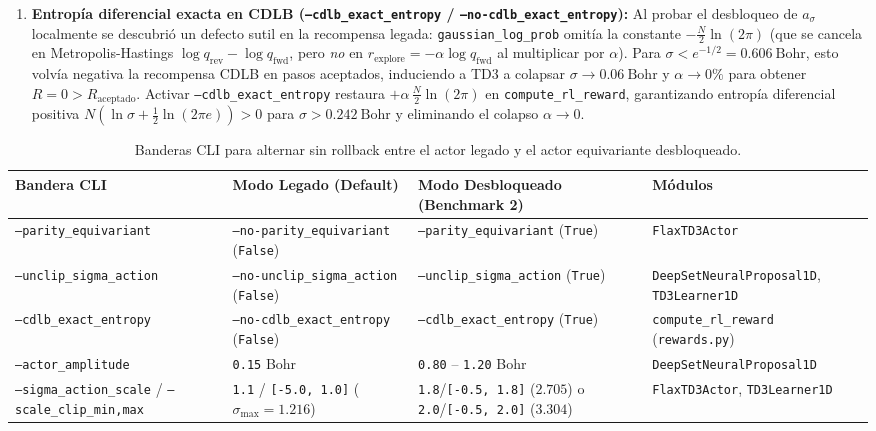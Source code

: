 \documentclass[10pt,a4paper]{article}
\begin{document}
\begin{enumerate}
\item \textbf{Entropía diferencial exacta en CDLB (\texttt{--cdlb\_exact\_entropy} / \texttt{--no-cdlb\_exact\_entropy}):} Al probar el desbloqueo de $a_\sigma$ localmente se descubrió un defecto sutil en la recompensa legada: \texttt{gaussian\_log\_prob} omitía la constante $-\frac{N}{2}\ln(2\pi)$ (que se cancela en Metropolis-Hastings $\log q_{\mathrm{rev}}-\log q_{\mathrm{fwd}}$, pero \emph{no} en $r_{\mathrm{explore}} = -\alpha \log q_{\mathrm{fwd}}$ al multiplicar por $\alpha$). Para $\sigma < e^{-1/2} = 0.606\ \mathrm{Bohr}$, esto volvía negativa la recompensa CDLB en pasos aceptados, induciendo a TD3 a colapsar $\sigma \to 0.06\ \mathrm{Bohr}$ y $\alpha \to 0\%$ para obtener $R = 0 > R_{\mathrm{aceptado}}$. Activar \texttt{--cdlb\_exact\_entropy} restaura $+\alpha\,\frac{N}{2}\ln(2\pi)$ en \texttt{compute\_rl\_reward}, garantizando entropía diferencial positiva $N(\ln\sigma + \frac{1}{2}\ln(2\pi e)) > 0$ para $\sigma > 0.242\ \mathrm{Bohr}$ y eliminando el colapso $\alpha \to 0$.
\end{enumerate}

\begin{table}[H]
\centering
\caption{Banderas CLI para alternar sin rollback entre el actor legado y el actor equivariante desbloqueado.}
\label{tab:actor_flags}
\begin{adjustbox}{max width=\textwidth}
\begin{tabular}{llll}
\toprule
\textbf{Bandera CLI} & \textbf{Modo Legado (Default)} & \textbf{Modo Desbloqueado (Benchmark 2)} & \textbf{Módulos} \\
\midrule
\texttt{--parity\_equivariant} & \texttt{--no-parity\_equivariant} (\texttt{False}) & \texttt{--parity\_equivariant} (\texttt{True}) & \texttt{FlaxTD3Actor} \\
\texttt{--unclip\_sigma\_action} & \texttt{--no-unclip\_sigma\_action} (\texttt{False}) & \texttt{--unclip\_sigma\_action} (\texttt{True}) & \texttt{DeepSetNeuralProposal1D}, \texttt{TD3Learner1D} \\
\texttt{--cdlb\_exact\_entropy} & \texttt{--no-cdlb\_exact\_entropy} (\texttt{False}) & \texttt{--cdlb\_exact\_entropy} (\texttt{True}) & \texttt{compute\_rl\_reward} (\texttt{rewards.py}) \\
\texttt{--actor\_amplitude} & \texttt{0.15} Bohr & \texttt{0.80} -- \texttt{1.20} Bohr & \texttt{DeepSetNeuralProposal1D} \\
\texttt{--sigma\_action\_scale} / \texttt{--scale\_clip\_min,max} & \texttt{1.1} / \texttt{[-5.0, 1.0]} ($\sigma_{\max}=1.216$) & \texttt{1.8}/\texttt{[-0.5, 1.8]} ($2.705$) o \texttt{2.0}/\texttt{[-0.5, 2.0]} ($3.304$) & \texttt{FlaxTD3Actor}, \texttt{TD3Learner1D} \\
\bottomrule
\end{tabular}
\end{adjustbox}
\end{table}
\end{document}
